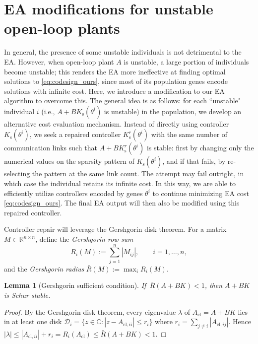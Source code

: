 \documentclass[letterpaper, 10pt, conference]{ieeeconf}
\newtheorem{lemma}{Lemma}
\begin{document}
\section{EA modifications for unstable open-loop plants}\label{sec:gersh_repair}
In general, the presence of some unstable individuals is not detrimental to the EA. However, when open-loop plant $A$ is unstable, a large portion of individuals become unstable; this renders the EA more ineffective at finding optimal solutions to \eqref{eq:codesign_ours}, since most of its population genes encode solutions with infinite cost. Here, we introduce a modification to our EA algorithm to overcome this. The general idea is as follows: for each ``unstable" individual $i$ (i.e., $A+BK_{\mathrm{s}}(\theta^i)$ is unstable) in the population, we develop an alternative cost evaluation mechanism. Instead of directly using controller $K_{\mathrm{s}}(\theta^i)$, we seek a repaired controller $K^r_{\mathrm{s}}(\theta^i)$ with the same number of communication links such that $A+BK^r_{\mathrm{s}}(\theta^i)$ is stable: first by changing only the numerical values on the sparsity pattern of $K_{\mathrm{s}}(\theta^i)$, and if that fails, by re-selecting the pattern at the same link count. The attempt may fail outright, in which case the individual retains its infinite cost. In this way, we are able to efficiently utilize controllers encoded by genes $\theta^i$ to continue minimizing EA cost \eqref{eq:codesign_ours}. The final EA output will then also be modified using this repaired controller. 

Controller repair will leverage the Gershgorin disk theorem. For a matrix $M\in\mathbb{R}^{n\times n}$, define the
\emph{Gershgorin row-sum}
\begin{equation}\label{eq:Ri}
  R_i(M) :=  \sum_{j=1}^{n} |M_{ij}|, \qquad i=1,\dots,n,
\end{equation}
and the \textit{Gershgorin radius}
$\bar{R}(M) := \max_{i} R_i(M)$.

\begin{lemma}[Gershgorin sufficient condition]\label{lem:gers}
If\, $\bar{R}(A+BK)<1$, then $A+BK$ is Schur stable.
\end{lemma}
\begin{proof}
By the Gershgorin disk theorem, every eigenvalue $\lambda$ of
$A_{\mathrm{cl}}=A+BK$ lies in at least one disk
$\mathcal{D}_i=\{z\in\mathbb{C}:|z-A_{\mathrm{cl},ii}|\le r_i\}$
where $r_i=\sum_{j\neq i}|A_{\mathrm{cl},ij}|$.  Hence
$|\lambda|\le |A_{\mathrm{cl},ii}|+r_i = R_i(A_{\mathrm{cl}})
\le \bar{R}(A+BK)< 1$.
\end{proof}
\end{document}
